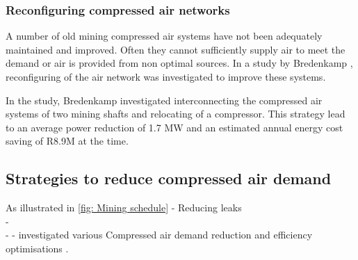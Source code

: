 		\subsubsection{Reconfiguring compressed air networks}
			A number of old mining compressed air systems  have not been adequately maintained and improved. Often they cannot sufficiently supply air to meet the demand or air is provided from non optimal sources. In a study by Bredenkamp \cite{Bredenkamp2013Masters}, reconfiguring of the air network was investigated to improve these systems.
			\par  
			In the study, Bredenkamp investigated interconnecting the compressed air systems of two mining shafts and relocating of a compressor. This strategy lead to an average power reduction of 1.7 MW and an estimated annual energy cost saving of R8.9M at the time.
			
	\subsection{Strategies to reduce compressed air demand}
	As illustrated in \cref{fig: Mining schedule}
		- Reducing leaks\\
		- \cite{Marais2012PhD}\\
		- \cite{Snyman2011Masters} - investigated various Compressed air demand reduction and efficiency optimisations .
		 
